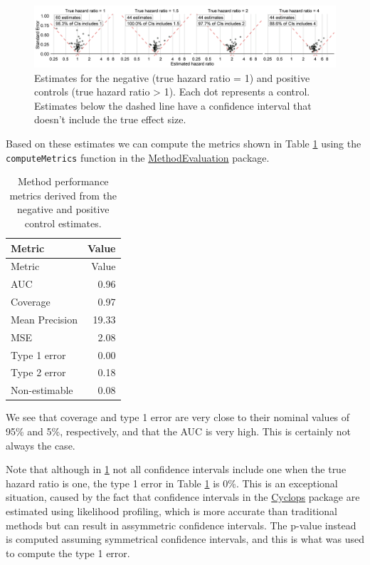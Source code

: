 \documentclass[11pt]{book}
\begin{document}
\begin{figure}

{\centering \includegraphics[width=1\linewidth]{images/MethodValidity/controls} 

}

\caption{Estimates for the negative (true hazard ratio = 1) and positive controls (true hazard ratio > 1). Each dot represents a control. Estimates below the dashed line have a confidence interval that doesn't include the true effect size.}\label{fig:controls}
\end{figure}

Based on these estimates we can compute the metrics shown in Table
\ref{tab:exampleMetrics} using the \texttt{computeMetrics} function in
the \href{https://ohdsi.github.io/MethodEvaluation/}{MethodEvaluation}
package.

\begin{longtable}[]{@{}lr@{}}
\caption{\label{tab:exampleMetrics} Method performance metrics derived from
the negative and positive control estimates.}\tabularnewline
\toprule
Metric & Value\tabularnewline
\midrule
\endfirsthead
\toprule
Metric & Value\tabularnewline
\midrule
\endhead
AUC & 0.96\tabularnewline
Coverage & 0.97\tabularnewline
Mean Precision & 19.33\tabularnewline
MSE & 2.08\tabularnewline
Type 1 error & 0.00\tabularnewline
Type 2 error & 0.18\tabularnewline
Non-estimable & 0.08\tabularnewline
\bottomrule
\end{longtable}

We see that coverage and type 1 error are very close to their nominal
values of 95\% and 5\%, respectively, and that the AUC is very high.
This is certainly not always the case.

Note that although in \ref{fig:controls} not all confidence intervals
include one when the true hazard ratio is one, the type 1 error in Table
\ref{tab:exampleMetrics} is 0\%. This is an exceptional situation,
caused by the fact that confidence intervals in the
\href{https://ohdsi.github.io/Cyclops/}{Cyclops} package are estimated
using likelihood profiling, which is more accurate than traditional
methods but can result in assymmetric confidence intervals. The p-value
instead is computed assuming symmetrical confidence intervals, and this
is what was used to compute the type 1 error.
\end{document}
